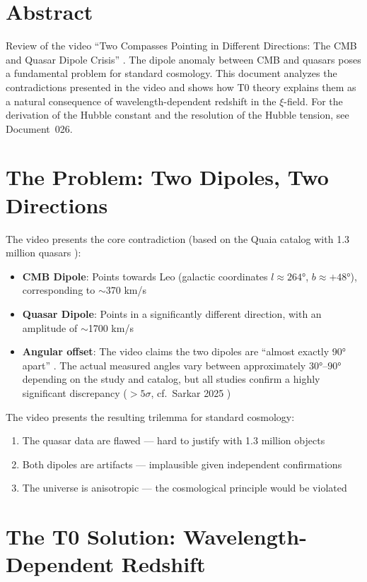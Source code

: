 \section*{Abstract}
	Review of the video ``Two Compasses Pointing in Different Directions: The CMB and Quasar Dipole Crisis'' \cite{video}. The dipole anomaly between CMB and quasars poses a fundamental problem for standard cosmology. This document analyzes the contradictions presented in the video and shows how T0 theory explains them as a natural consequence of wavelength-dependent redshift in the $\xi$-field. For the derivation of the Hubble constant and the resolution of the Hubble tension, see Document~026.

\section{The Problem: Two Dipoles, Two Directions}

	The video presents the core contradiction (based on the Quaia catalog with 1.3 million quasars \cite{storey2024}):
	\begin{itemize}
		\item \textbf{CMB Dipole}: Points towards Leo (galactic coordinates $l \approx 264°$, $b \approx +48°$), corresponding to $\sim$370 km/s
		\item \textbf{Quasar Dipole}: Points in a significantly different direction, with an amplitude of $\sim$1700 km/s \cite{mittal2024}
		\item \textbf{Angular offset}: The video claims the two dipoles are ``almost exactly 90° apart'' \cite{secrest2024}. The actual measured angles vary between approximately $30°$--$90°$ depending on the study and catalog, but all studies confirm a highly significant discrepancy ($> 5\sigma$, cf.\ Sarkar 2025 \cite{sarkar2025})
	\end{itemize}

	The video presents the resulting trilemma for standard cosmology:
	\begin{enumerate}
		\item The quasar data are flawed --- hard to justify with 1.3 million objects
		\item Both dipoles are artifacts --- implausible given independent confirmations
		\item The universe is anisotropic --- the cosmological principle would be violated
	\end{enumerate}

\section{The T0 Solution: Wavelength-Dependent Redshift}


